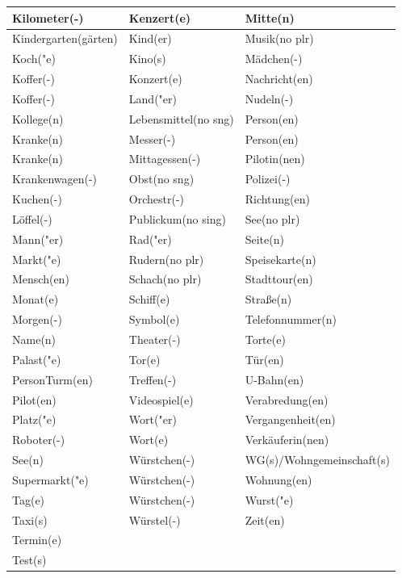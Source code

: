 \documentclass{article}
\begin{document}
\begin{table}[h!]
\begin{tabular}{|>{\raggedright\arraybackslash}p{5cm}|>{\raggedright\arraybackslash}p{5cm}|>{\raggedright\arraybackslash}p{5cm}|}
        Kilometer(-) & Kenzert(e) & Mitte(n) \\\hline
        Kindergarten(gärten) & Kind(er) & Musik(no plr) \\\hline
        Koch("e) & Kino(s) & Mädchen(-) \\\hline
        Koffer(-) & Konzert(e) & Nachricht(en) \\\hline
        Koffer(-) & Land("er) & Nudeln(-) \\\hline
        Kollege(n) & Lebensmittel(no sng) & Person(en) \\\hline
        Kranke(n) & Messer(-) & Person(en) \\\hline
        Kranke(n) & Mittagessen(-) & Pilotin(nen) \\\hline
        Krankenwagen(-) & Obst(no sng) & Polizei(-) \\\hline
        Kuchen(-) & Orchestr(-) & Richtung(en) \\\hline
        Löffel(-) & Publickum(no sing) & See(no plr) \\\hline
        Mann("er) & Rad("er) & Seite(n) \\\hline
        Markt("e) & Rudern(no plr) & Speisekarte(n) \\\hline
        Mensch(en) & Schach(no plr) & Stadttour(en) \\\hline
        Monat(e) & Schiff(e) & Stra\ss{}e(n) \\\hline
        Morgen(-) & Symbol(e) & Telefonnummer(n) \\\hline
        Name(n) & Theater(-) & Torte(e) \\\hline
        Palast("e) & Tor(e) & Tür(en) \\\hline
        PersonTurm(en) & Treffen(-) & U-Bahn(en) \\\hline
        Pilot(en) & Videospiel(e) & Verabredung(en) \\\hline
        Platz("e) & Wort("er) & Vergangenheit(en) \\\hline
        Roboter(-) & Wort(e) & Verkäuferin(nen) \\\hline
        See(n) & Würstchen(-) & WG(s)/Wohngemeinschaft(s) \\\hline
        Supermarkt("e) & Würstchen(-) & Wohnung(en) \\\hline
        Tag(e) & Würstchen(-) & Wurst("e) \\\hline
        Taxi(s) & Würstel(-) & Zeit(en) \\\hline
        Termin(e) &  &  \\\hline
        Test(s) &  &  \\\hline

\end{tabular}
\end{table}
\end{document}
